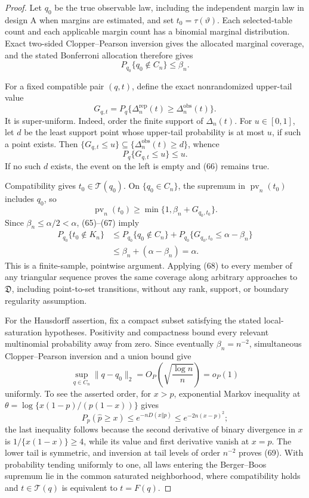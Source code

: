 \documentclass{article}
\begin{document}
\begin{proof}
Let \(q_0\) be the true observable law, including the independent margin law in design A when margins are estimated, and set \(t_0=\tau(\vartheta)\).  Each selected-table count and each applicable margin count has a binomial marginal distribution.  Exact two-sided Clopper--Pearson inversion gives the allocated marginal coverage, and the stated Bonferroni allocation therefore gives
\[
 P_{q_0}\{q_0\notin C_n\}\le\beta_n.                    \tag{65}
\]

For a fixed compatible pair \((q,t)\), define the exact nonrandomized upper-tail value
\[
 G_{q,t}=P_q\{\Delta_n^{\mathrm{rep}}(t)
                 \ge\Delta_n^{\mathrm{obs}}(t)\}.
\]
It is super-uniform.  Indeed, order the finite support of \(\Delta_n(t)\).  For \(u\in[0,1]\), let \(d\) be the least support point whose upper-tail probability is at most \(u\), if such a point exists.  Then
\(\{G_{q,t}\le u\}\subseteq\{\Delta_n^{\mathrm{obs}}(t)\ge d\}\), whence
\[
 P_q\{G_{q,t}\le u\}\le u.                              \tag{66}
\]
If no such \(d\) exists, the event on the left is empty and (66) remains true.

Compatibility gives \(t_0\in\mathcal T(q_0)\).  On \(\{q_0\in C_n\}\), the supremum in \(\operatorname{pv}_n(t_0)\) includes \(q_0\), so
\[
 \operatorname{pv}_n(t_0)
 \ge\min\{1,\beta_n+G_{q_0,t_0}\}.                       \tag{67}
\]
Since \(\beta_n\le\alpha/2<\alpha\), (65)--(67) imply
\[
 \begin{aligned}
 P_{q_0}\{t_0\notin K_n\}
 &\le P_{q_0}\{q_0\notin C_n\}
   +P_{q_0}\{G_{q_0,t_0}\le\alpha-\beta_n\}\\
 &\le\beta_n+(\alpha-\beta_n)=\alpha.
 \end{aligned}                                             \tag{68}
\]
This is a finite-sample, pointwise argument.  Applying (68) to every member of any triangular sequence proves the same coverage along arbitrary approaches to \(\mathfrak D\), including point-to-set transitions, without any rank, support, or boundary regularity assumption.

For the Hausdorff assertion, fix a compact subset satisfying the stated local-saturation hypotheses.  Positivity and compactness bound every relevant multinomial probability away from zero.  Since eventually \(\beta_n=n^{-2}\), simultaneous Clopper--Pearson inversion and a union bound give
\[
 \sup_{q\in C_n}\|q-q_0\|_2
 =O_P\!\left(\sqrt{\frac{\log n}{n}}\right)=o_P(1)      \tag{69}
\]
uniformly.  To see the asserted order, for \(x>p\), exponential Markov inequality at
\(\theta=\log\{x(1-p)/(p(1-x))\}\) gives
\[
 P_p(\widehat p\ge x)
 \le e^{-nD(x\Vert p)}
 \le e^{-2n(x-p)^2};                                      \tag{70}
\]
the last inequality follows because the second derivative of binary divergence in \(x\) is \(1/\{x(1-x)\}\ge4\), while its value and first derivative vanish at \(x=p\).  The lower tail is symmetric, and inversion at tail levels of order \(n^{-2}\) proves (69).  With probability tending uniformly to one, all laws entering the Berger--Boos supremum lie in the common saturated neighborhood, where compatibility holds and \(t\in\mathcal T(q)\) is equivalent to \(t=F(q)\).


\end{proof}
\end{document}
